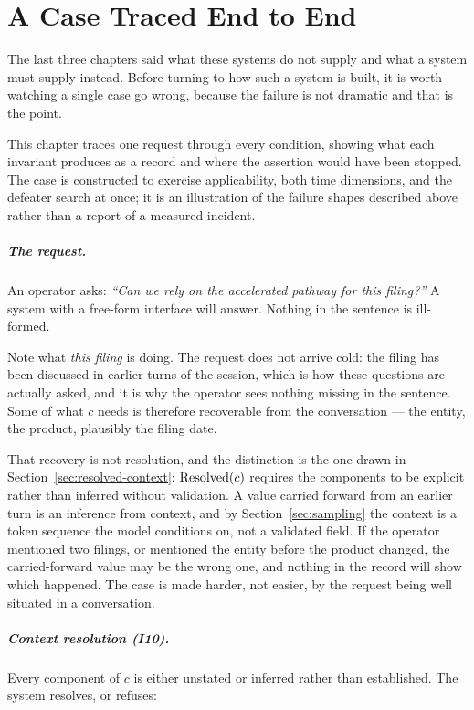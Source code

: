 \chapter{A Case Traced End to End}
\label{ch:traced-case}
\label{sec:worked}

The last three chapters said what these systems do not supply and what a system must
supply instead. Before turning to how such a system is built, it is worth watching a
single case go wrong, because the failure is not dramatic and that is the point.

This chapter traces one request through every condition, showing what each invariant
produces as a record and where the assertion would have been stopped. The case is constructed to exercise applicability, both time
dimensions, and the defeater search at once; it is an illustration of the failure shapes
described above rather than a report of a measured incident.

\paragraph{The request.} An operator asks: \emph{``Can we rely on the accelerated
pathway for this filing?''} A system with a free-form interface will answer. Nothing in
the sentence is ill-formed.

Note what \emph{this filing} is doing. The request does not arrive cold: the filing has
been discussed in earlier turns of the session, which is how these questions are
actually asked, and it is why the operator sees nothing missing in the sentence. Some
of what $c$ needs is therefore recoverable from the conversation --- the entity, the
product, plausibly the filing date.

That recovery is not resolution, and the distinction is the one drawn in
Section~\ref{sec:resolved-context}: $\operatorname{Resolved}(c)$ requires the components to be
explicit rather than inferred without validation. A value carried forward from an
earlier turn is an inference from context, and by
Section~\ref{sec:sampling} the context is a token sequence the model conditions on,
not a validated field. If the operator mentioned two filings, or mentioned the entity
before the product changed, the carried-forward value may be the wrong one, and
nothing in the record will show which happened. The case is made harder, not easier,
by the request being well situated in a conversation.

\paragraph{Context resolution (I10).} Every component of $c$ is either unstated or
inferred rather than established. The system resolves, or refuses:

